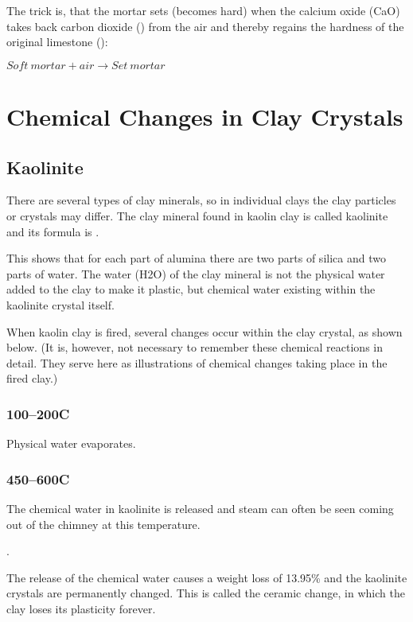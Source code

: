 The trick is, that the mortar sets (becomes hard) when the calcium oxide (CaO) 
takes back carbon dioxide () from the air and thereby regains the 
hardness of the original limestone ():


$Soft~mortar+air \rightarrow Set~mortar$
\section{Chemical Changes in Clay Crystals}
\subsection{Kaolinite}
There are several types of clay minerals, so in individual clays the clay 
particles or crystals may differ. The clay mineral found in kaolin clay is 
called kaolinite and its formula is .

This shows that for each part of alumina there are two parts of silica and two 
parts of water. The water (H2O) of the clay mineral is not the physical water 
added to the clay to make it plastic, but chemical water existing within the 
kaolinite crystal itself.

When kaolin clay is fired, several changes occur within the clay crystal, as 
shown below. (It is, however, not necessary to remember these chemical 
reactions in detail. They serve here as illustrations of chemical changes 
taking place in the fired clay.)
\subsubsection{100--200\degree C}
Physical water evaporates.
\subsubsection{450--600\degree C}
The chemical water in kaolinite is released and steam can often be seen coming 
out of the chimney at this temperature. 

. 

The release of the chemical water causes a weight loss of 13.95\% and the 
kaolinite crystals are permanently changed. This is called the ceramic change, 
in which the clay loses its plasticity forever.
